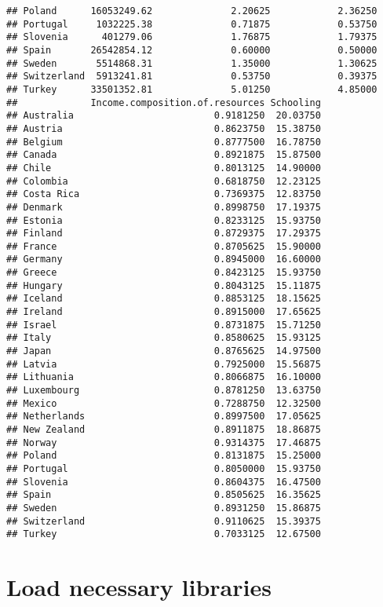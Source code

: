 \documentclass[
]{article}
\begin{document}
\begin{verbatim}
## Poland      16053249.62              2.20625            2.36250
## Portugal     1032225.38              0.71875            0.53750
## Slovenia      401279.06              1.76875            1.79375
## Spain       26542854.12              0.60000            0.50000
## Sweden       5514868.31              1.35000            1.30625
## Switzerland  5913241.81              0.53750            0.39375
## Turkey      33501352.81              5.01250            4.85000
##             Income.composition.of.resources Schooling
## Australia                         0.9181250  20.03750
## Austria                           0.8623750  15.38750
## Belgium                           0.8777500  16.78750
## Canada                            0.8921875  15.87500
## Chile                             0.8013125  14.90000
## Colombia                          0.6818750  12.23125
## Costa Rica                        0.7369375  12.83750
## Denmark                           0.8998750  17.19375
## Estonia                           0.8233125  15.93750
## Finland                           0.8729375  17.29375
## France                            0.8705625  15.90000
## Germany                           0.8945000  16.60000
## Greece                            0.8423125  15.93750
## Hungary                           0.8043125  15.11875
## Iceland                           0.8853125  18.15625
## Ireland                           0.8915000  17.65625
## Israel                            0.8731875  15.71250
## Italy                             0.8580625  15.93125
## Japan                             0.8765625  14.97500
## Latvia                            0.7925000  15.56875
## Lithuania                         0.8066875  16.10000
## Luxembourg                        0.8781250  13.63750
## Mexico                            0.7288750  12.32500
## Netherlands                       0.8997500  17.05625
## New Zealand                       0.8911875  18.86875
## Norway                            0.9314375  17.46875
## Poland                            0.8131875  15.25000
## Portugal                          0.8050000  15.93750
## Slovenia                          0.8604375  16.47500
## Spain                             0.8505625  16.35625
## Sweden                            0.8931250  15.86875
## Switzerland                       0.9110625  15.39375
## Turkey                            0.7033125  12.67500
\end{verbatim}

\section{Load necessary libraries}\label{load-necessary-libraries}
\end{document}
